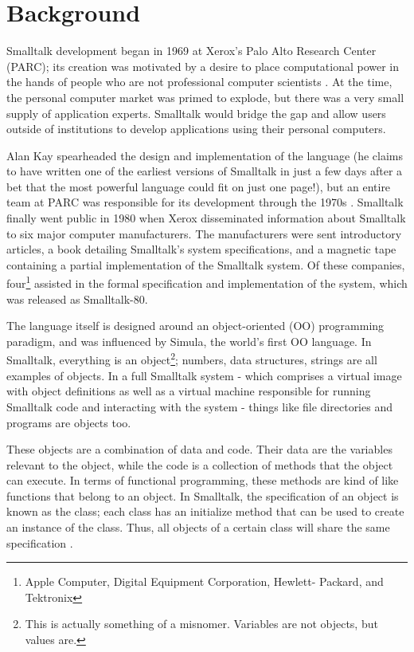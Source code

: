 \section{Background}

Smalltalk development began in 1969 at Xerox's Palo Alto Research Center (PARC); its creation was motivated by a desire to place computational power in the hands of people who are not professional computer scientists \cite{bitsandpieces}. At the time, the personal computer market was primed to explode, but there was a very small supply of application experts. Smalltalk would bridge the gap and allow users outside of institutions to develop applications using their personal computers. 

Alan Kay spearheaded the design and implementation of the language (he claims to have written one of the earliest versions of Smalltalk in just a few days after a bet that the most powerful language could fit on just one page!), but an entire team at PARC was responsible for its development through the 1970s \cite{alankay}. Smalltalk finally went public in 1980 when Xerox disseminated information about Smalltalk to six major computer manufacturers. The manufacturers were sent introductory articles, a book detailing Smalltalk's system specifications, and a magnetic tape containing a partial implementation of the Smalltalk system. Of these companies, four\footnote{Apple Computer, Digital Equipment Corporation, Hewlett- Packard, and Tektronix} assisted in the formal specification and implementation of the system, which was released as Smalltalk-80.

The language itself is designed around an object-oriented (OO) programming paradigm, and was influenced by Simula, the world's first OO language. In Smalltalk, everything is an object\footnote{This is actually something of a misnomer. Variables are not objects, but values are.}; numbers, data structures, strings are all examples of objects.  In a full Smalltalk system - which comprises a virtual image with object definitions as well as a virtual machine responsible for running Smalltalk code and interacting with the system -  things like file directories and programs are objects too. 

These objects are a combination of data and code. Their data are the variables relevant to the object, while the code is a collection of methods that the object can execute. In terms of functional programming, these methods are kind of like functions that belong to an object. In Smalltalk, the specification of an object is known as the class; each class has an initialize method that can be used to create an instance of the class. Thus, all objects of a certain class will share the same specification \cite{thebluebook}.

